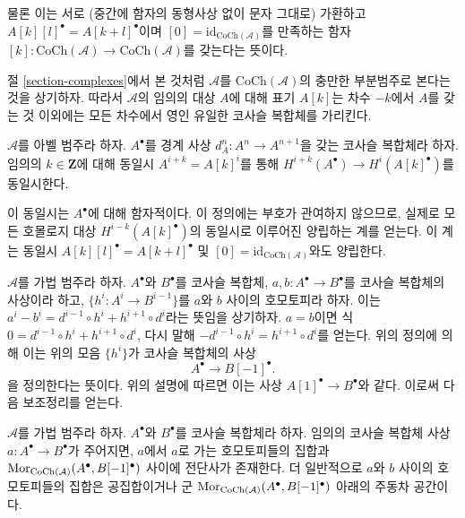 \noindent
물론 이는 서로 (중간에 함자의 동형사상 없이 문자 그대로) 가환하고
$A[k][l]^\bullet = A[k + l]^\bullet$이며
$[0] = \text{id}_{\text{CoCh}(\mathcal{A})}$를 만족하는 함자
$[k] : \text{CoCh}(\mathcal{A}) \to \text{CoCh}(\mathcal{A})$를
갖는다는 뜻이다.

\medskip\noindent
절 \ref{section-complexes}에서 본 것처럼 $\mathcal{A}$를
$\text{CoCh}(\mathcal{A})$의 충만한 부분범주로 본다는 것을 상기하자.
따라서 $\mathcal{A}$의 임의의 대상 $A$에 대해 표기 $A[k]$는
차수 $-k$에서 $A$를 갖는 것 이외에는 모든 차수에서 영인 유일한
코사슬 복합체를 가리킨다.

\begin{definition}
\label{definition-cohomology-shift}
$\mathcal{A}$를 아벨 범주라 하자.
$A^\bullet$를 경계 사상 $d_A^n : A^n \to A^{n + 1}$을 갖는 코사슬
복합체라 하자. 임의의 $k \in \mathbf{Z}$에 대해 동일시
$A^{i + k} = A[k]^i$를 통해
{\it $H^{i + k}(A^\bullet) \longrightarrow H^i(A[k]^\bullet)$}를
동일시한다.
\end{definition}

\noindent
이 동일시는 $A^\bullet$에 대해 함자적이다. 이 정의에는 부호가
관여하지 않으므로, 실제로 모든 호몰로지 대상
$H^{i - k}(A[k]^\bullet)$의 동일시로 이루어진 양립하는 계를 얻는다.
이 계는 동일시 $A[k][l]^\bullet = A[k + l]^\bullet$ 및
$[0] = \text{id}_{\text{CoCh}(\mathcal{A})}$와도 양립한다.

\medskip\noindent
$\mathcal{A}$를 가법 범주라 하자.
$A^\bullet$와 $B^\bullet$를 코사슬 복합체,
$a, b : A^\bullet \to B^\bullet$를 코사슬 복합체의 사상이라 하고,
$\{h^i : A^i \to B^{i - 1}\}$를 $a$와 $b$ 사이의 호모토피라 하자.
이는
$a^i - b^i = d^{i - 1} \circ h^i + h^{i + 1} \circ d^i$라는 뜻임을
상기하자. $a = b$이면 식
$0 = d^{i - 1} \circ h^i + h^{i + 1} \circ d^i$, 다시 말해
$ - d^{i - 1} \circ h^i = h^{i + 1} \circ d^i$를 얻는다.
위의 정의에 의해 이는 위의 모음 $\{h^i\}$가 코사슬 복합체의 사상
$$
A^\bullet \longrightarrow B[-1]^\bullet.
$$
을 정의한다는 뜻이다. 위의 설명에 따르면 이는 사상
$A[1]^\bullet \to B^\bullet$와 같다. 이로써 다음 보조정리를 얻는다.

\begin{lemma}
\label{lemma-homotopy-shift-cochain}
$\mathcal{A}$를 가법 범주라 하자.
$A^\bullet$와 $B^\bullet$를 코사슬 복합체라 하자.
임의의 코사슬 복합체 사상 $a : A^\bullet \to B^\bullet$가 주어지면,
$a$에서 $a$로 가는 호모토피들의 집합과
$\mathop{\mathrm{Mor}}\nolimits_{\text{CoCh}(\mathcal{A})}(A^\bullet, B[-1]^\bullet)$ 사이에
전단사가 존재한다. 더 일반적으로 $a$와 $b$ 사이의 호모토피들의 집합은
공집합이거나 군
$\mathop{\mathrm{Mor}}\nolimits_{\text{CoCh}(\mathcal{A})}(A^\bullet, B[-1]^\bullet)$ 아래의
주동차 공간이다.
\end{lemma}

